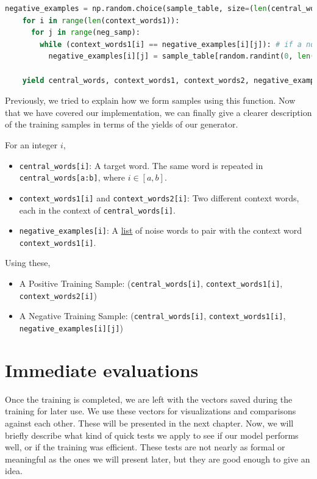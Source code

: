 \begin{lstlisting}[language=Python, caption=Batch generating function]
    negative_examples = np.random.choice(sample_table, size=(len(central_words), neg_samp))  # list of negative samples for each context word
    for i in range(len(context_words1)):
      for j in range(neg_samp):
        while (context_words1[i] == negative_examples[i][j]): # if a noise word is the same with the context
          negative_examples[i][j] = sample_table[random.randint(0, len(sample_table))] # force it to be different than corresponding context sample

    yield central_words, context_words1, context_words2, negative_examples
\end{lstlisting}

Previously, we tried to explain how we form samples using this function. Now that we have covered our implementation, we can finally give a clearer description of the training samples in terms of the yields of our generator.

For an integer $i$,
\begin{itemize}
    \item \verb|central_words[i]|: A target word. The same word is repeated in\\ \verb|central_words[a:b]|, where $i \in [a, b]$.
    \item \verb|context_words1[i]| and \verb|context_words2[i]|: Two different context words, each in the context of \verb|central_words[i]|.
    \item \verb|negative_examples[i]|: A \underline{list} of noise words to pair with the context word \verb|context_words1[i]|.
\end{itemize}

Using these,
\begin{itemize}
    \item A Positive Training Sample: (\verb|central_words[i]|, \verb|context_words1[i]|, \verb|context_words2[i]|)
    \item A Negative Training Sample: (\verb|central_words[i]|, \verb|context_words1[i]|, \verb|negative_examples[i][j]|)
\end{itemize}

\section{Immediate evaluations}
\label{sec:immediate}

Once the training is completed, we are left with the vectors saved during the training for later use. We use these vectors for visualizations and comparisons against each other. These will be presented in the next chapter. Now, we will briefly describe what kind of quick tests we apply to see if our model performs well, or if the training was efficient. These tests are not nearly as formal or meaningful as the ones we will present later, but they are good enough to give an idea.

